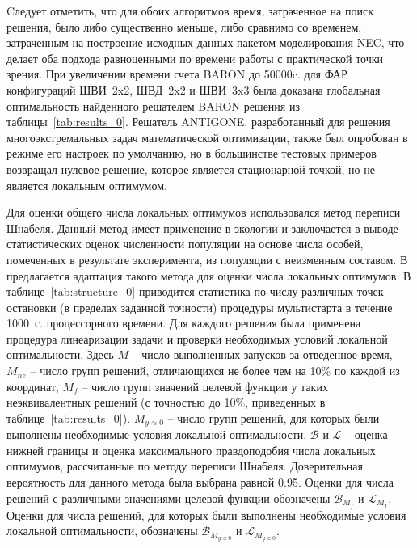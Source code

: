 Cледует отметить, что для обоих алгоритмов время, затраченное на поиск решения, было либо существенно меньше, либо сравнимо со временем, затраченным на построение исходных данных пакетом моделирования NEC, что делает оба подхода равноценными по времени работы с практической точки зрения. При увеличении времени счета BARON до 50000c. для ФАР конфигураций ШВИ~2x2, ШВД~2x2 и ШВИ~3x3 была доказана глобальная оптимальность найденного решателем BARON решения из таблицы~\ref{tab:results_0}.
Решатель ANTIGONE, разработанный для решения многоэкстремальных задач математической оптимизации, также был опробован в режиме его настроек по умолчанию, но в большинстве тестовых примеров возвращал нулевое решение, которое является стационарной точкой, но не является локальным оптимумом.

Для оценки общего числа локальных оптимумов использовался метод переписи Шнабеля. Данный метод имеет применение в экологии и заключается в
выводе статистических оценок численности популяции на основе числа особей, помеченных в результате эксперимента, из популяции с неизменным
составом. В~ предлагается адаптация такого метода для оценки числа локальных оптимумов. В таблице~\ref{tab:structure_0} приводится статистика по числу различных точек остановки (в пределах заданной точности) процедуры мультистарта в течение 1000~с. процессорного времени. Для каждого решения была применена процедура линеаризации задачи и проверки необходимых условий локальной оптимальности. Здесь {$M$} -- число выполненных запусков за отведенное время, $M_{ne}$ -- число групп решений, отличающихся не более чем на 10\% по каждой из координат, {$M_{f}$} -- число групп значений целевой функции у таких неэквивалентных решений (с точностью до 10\%, приведенных в таблице~\ref{tab:results_0}). {$M_{y\approx0}$} -- число групп решений, для которых были выполнены необходимые условия локальной оптимальности. $\mathcal{B}$ и $\mathcal{L}$ -- оценка нижней границы и оценка максимального правдоподобия числа локальных оптимумов, рассчитанные по методу переписи Шнабеля. Доверительная вероятность для данного метода была выбрана равной 0.95. Оценки для числа решений с различными значениями целевой функции обозначены $\mathcal{B}_{M_f}$ и $\mathcal{L}_{M_f}$. Оценки для числа решений, для которых были выполнены необходимые условия локальной оптимальности, обозначены $\mathcal{B}_{M_{y\approx0}}$ и $\mathcal{L}_{M_{y\approx0}}$.


